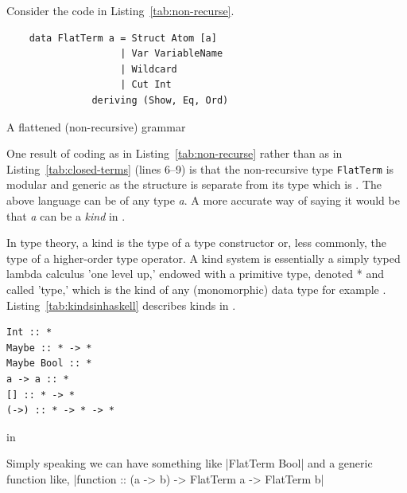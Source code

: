 \documentclass[thesis-solanki.tex]{subfiles}
\begin{document}

Consider the code in Listing~\ref{tab:non-recurse}.
\begin{code-list}[H]
  \begin{verbatim}
    data FlatTerm a = Struct Atom [a]
                    | Var VariableName
                    | Wildcard
                    | Cut Int
               deriving (Show, Eq, Ord)
  \end{verbatim}
  \caption{A flattened (non-recursive) grammar}
  \label{tab:non-recurse}
\end{code-list}

One result of coding as in Listing~\ref{tab:non-recurse} rather than as in
  Listing~\ref{tab:closed-terms} (lines 6--9)
  is that the non-recursive type
\texttt{FlatTerm} is modular and generic as the structure
is separate
from its
type which is   .
The above language can be of any type \textit{a}.
A more accurate way of saying it would be that \textit{a} can be a \textit{kind} in
.

In type theory, a kind is the type of a type constructor or, less commonly, the type of a higher-order type operator. A kind system is
essentially a simply typed lambda calculus 'one level up,' endowed with a primitive type, denoted * and called 'type,' which is the kind of
any (monomorphic) data type for example \cite{website:kindhaskellwiki}. Listing~\ref{tab:kindsinhaskell} describes kinds in 
.

\begin{code-list}[H]
\begin{verbatim}
Int :: *
Maybe :: * -> *
Maybe Bool :: *
a -> a :: *
[] :: * -> *
(->) :: * -> * -> *
\end{verbatim}
\caption{ in }
\label{tab:kindsinhaskell}
\end{code-list}

Simply speaking we can have something like
|FlatTerm Bool|
and a generic function like,
|function :: (a -> b) -> FlatTerm a -> FlatTerm b|
\end{document}

